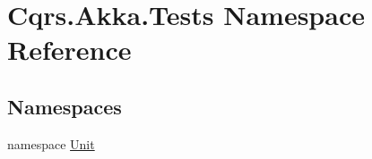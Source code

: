 \hypertarget{namespaceCqrs_1_1Akka_1_1Tests}{}\section{Cqrs.\+Akka.\+Tests Namespace Reference}
\label{namespaceCqrs_1_1Akka_1_1Tests}
\subsection*{Namespaces}
\begin{DoxyCompactItemize}
\item 
namespace \hyperlink{namespaceCqrs_1_1Akka_1_1Tests_1_1Unit}{Unit}
\end{DoxyCompactItemize}

